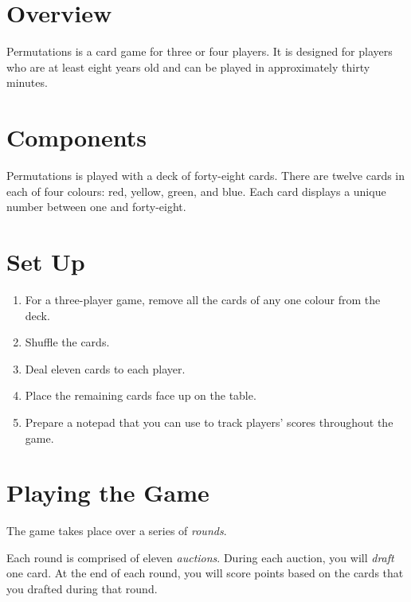 \documentclass[a6paper, parskip=half, DIV=14, 10pt]{scrartcl}
\begin{document}
\newpage
\setmainfont{Tex Gyre Schola}%
\raggedright%
\section*{Overview}
Permutations is a card game for three or four players.
It is designed for players who are at least eight years old and can be played in
approximately thirty minutes.

\vfill

\section*{Components}
Permutations is played with a deck of forty-eight cards.
There are twelve cards in each of four colours: red, yellow, green, and blue.
Each card displays a unique number between one and forty-eight.

\vfill

\section*{Set Up}
\begin{enumerate}[leftmargin=*]
	\item For a three-player game, remove all the cards of any one colour from the deck.
	\item Shuffle the cards.
	\item Deal eleven cards to each player.
	\item Place the remaining cards face up on the table.
	\item Prepare a notepad that you can use to track players' scores throughout the game.
\end{enumerate}

\newpage

\section*{Playing the Game}
The game takes place over a series of \emph{rounds}.

Each round is comprised of eleven \emph{auctions}.
During each auction, you will \emph{draft} one card.
At the end of each round, you will score points based on the cards that you drafted during that round.
\end{document}
